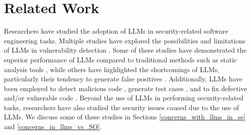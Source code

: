 \section{Related Work}


Researchers have studied the adoption of LLMs in security-related software engineering tasks. Multiple studies have explored the possibilities and limitations of LLMs in vulnerability detection \citep{zhou2024large, noever2023can, bakhshandeh2023using, purba2023software, cheshkov2023evaluation, wang2023defecthunter, liu2023harnessing}. Some of these studies have demonstrated the superior performance of LLMs compared to traditional methods such as static analysis tools \citep{zhou2024large, noever2023can, bakhshandeh2023using}, while others have highlighted the shortcomings of LLMs, particularly their tendency to generate false positives \citep{purba2023software, cheshkov2023evaluation, Banerjee23}. Additionally, LLMs have been employed to detect malicious code \citep{plate, eli}, generate test cases \citep{yao2023llm, zhang2023well}, and to fix defective and/or vulnerable code \citep{jiang2023impact, pearce2023examining, xia2022practical, jin2023inferfix}. Beyond the use of LLMs in performing security-related tasks, researchers have also studied the security issues caused due to the use of LLMs. We discuss some of these studies in Sections \ref{concerns_with_llms_in_se} and \ref{concerns_in_llms_vs_SO}.

